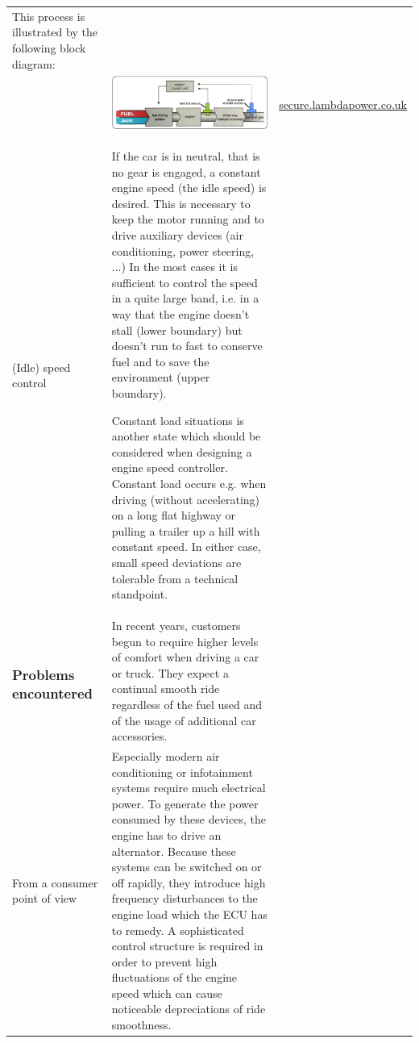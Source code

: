 \begin{xtabular}{|p{3.8cm}|p{8.3cm}|p{4.2cm}|}
	This process is illustrated by the following block diagram:
	&
	
	\\
	
	&
	{
		\center
		\includegraphics[width=8cm]{material/marvin/LambdaFunctionalDiagram.jpg}
	}
	&
	\url{secure.lambdapower.co.uk}
	\\
	(Idle) speed control
	&
	If the car is in neutral, that is no gear is engaged, a constant engine speed (the idle speed) is desired. This is necessary to keep the motor running and to drive auxiliary devices (air conditioning, power steering, ...) In the most cases it is sufficient to control the speed in a quite large band, i.e. in a way that the engine doesn't stall (lower boundary) but doesn't run to fast to conserve fuel and to save the environment (upper boundary).
	
	Constant load situations is another state which should be considered when designing a engine speed controller. Constant load occurs e.g. when driving (without accelerating) on a long flat highway or pulling a trailer up a hill with constant speed. In either case, small speed deviations are tolerable from a technical standpoint.
	&
	\\
	\vspace*{-1.25\baselineskip}
	\subsubsection{Problems encountered}
	&
	In recent years, customers begun to require higher levels of comfort when driving a car or truck. They expect a continual smooth ride regardless of the fuel used and of the usage of additional car accessories.
	&
	
	\\
	From a consumer point of view
	&
	Especially modern air conditioning or infotainment systems require much electrical power. To generate the power consumed by these devices, the engine has to drive an alternator. Because these systems can be switched on or off rapidly, they introduce high frequency disturbances to the engine load which the ECU has to remedy. A sophisticated control structure is required in order to prevent high fluctuations of the engine speed which can cause noticeable depreciations of ride smoothness.
	

\end{xtabular}
